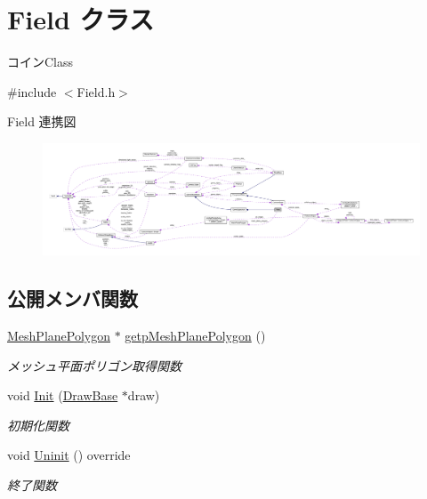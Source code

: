 \hypertarget{class_field}{}\section{Field クラス}
\label{class_field}


コイン\+Class  




{\ttfamily \#include $<$Field.\+h$>$}



Field 連携図\nopagebreak
\begin{figure}[H]
\begin{center}
\leavevmode
\includegraphics[width=350pt]{class_field__coll__graph}
\end{center}
\end{figure}
\subsection*{公開メンバ関数}
\begin{DoxyCompactItemize}
\item 
\mbox{\hyperlink{class_mesh_plane_polygon}{Mesh\+Plane\+Polygon}} $\ast$ \mbox{\hyperlink{class_field_ac3603afd80f48bb6bf62752a621578f3}{getp\+Mesh\+Plane\+Polygon}} ()
\begin{DoxyCompactList}\small\item\em メッシュ平面ポリゴン取得関数 \end{DoxyCompactList}\item 
void \mbox{\hyperlink{class_field_a8360ab68eaf346984eab8bce4c37c3b3}{Init}} (\mbox{\hyperlink{class_draw_base}{Draw\+Base}} $\ast$draw)
\begin{DoxyCompactList}\small\item\em 初期化関数 \end{DoxyCompactList}\item 
void \mbox{\hyperlink{class_field_a6d1015e2409daa87cd00485ac1efc06b}{Uninit}} () override
\begin{DoxyCompactList}\small\item\em 終了関数 \end{DoxyCompactList}\end{DoxyCompactItemize}
